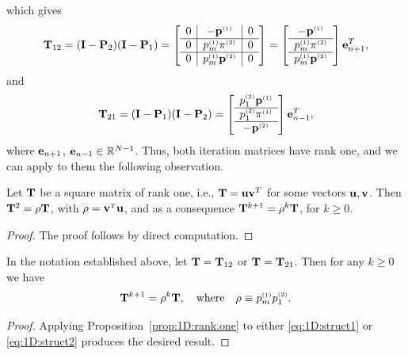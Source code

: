 %
which gives
%
\begin{equation}\label{eq:1D:struct1}
\mathbf{T}_{12}=(\mathbf{I}-\mathbf{P}_2)(\mathbf{I}-\mathbf{P}_1) = \left[\begin{array}{c|c|c}0&-\mathbf{p}^{\scriptscriptstyle (1)}&0\\\hline 0&p^{\scriptscriptstyle (1)}_m\pi^{\scriptscriptstyle (2)}&0\\\hline 0&p^{\scriptscriptstyle (1)}_m \mathbf{p}^{\scriptscriptstyle (2)}&0\end{array}\right]=
\left[\begin{array}{c}-\mathbf{p}^{\scriptscriptstyle (1)}\\\hline p^{\scriptscriptstyle (1)}_m\pi^{\scriptscriptstyle (2)}\\\hline p^{\scriptscriptstyle (1)}_m \mathbf{p}^{\scriptscriptstyle (2)}\end{array}\right]
\mathbf{e}_{n+1}^T,
\end{equation}
%
and
%
\begin{equation}\label{eq:1D:struct2}
\mathbf{T}_{21}=(\mathbf{I}-\mathbf{P}_1)(\mathbf{I}-\mathbf{P}_2)=
\left[\begin{array}{c}
 p^{\scriptscriptstyle (2)}_1 \mathbf{p}^{\scriptscriptstyle (1)}\\
\hline
 p^{\scriptscriptstyle (2)}_1\pi^{\scriptscriptstyle (1)}\\
 \hline
  -\mathbf{p}^{\scriptscriptstyle (2)}\end{array}\right]
\mathbf{e}_{n-1}^T,
\end{equation}
where $\mathbf{e}_{n+1}$, $\mathbf{e}_{n-1}\in \mathbb{R}^{N-1}$.
%
Thus, both iteration matrices have rank one, and we can apply to them the
following observation.

\begin{prop} \label{prop:1D:rank.one}
Let $\mathbf{T}$ be a square matrix of rank one, i.e., $\mathbf{T}=\mathbf{u}\mathbf{v}^T$ for some
vectors $\mathbf{u}, \mathbf{v}$. Then $\mathbf{T}^2 = \rho \mathbf{T}$, with $\rho = \mathbf{v}^{\scriptscriptstyle T}\mathbf{u}$, and as
a consequence $\mathbf{T}^{k+1} = \rho^{k} \mathbf{T}$, for $k\geq 0$.
\end{prop}

\begin{proof}
The proof follows by direct computation.
\end{proof}

\begin{cor}\label{cor:1D:rank.one}
In the notation established above, let $\mathbf{T}=\mathbf{T}_{12}$ or
$\mathbf{T}=\mathbf{T}_{21}$. Then for any $k\geq 0$ we have
%
\begin{equation}\label{eq:1D:Tkp1_1d}
\mathbf{T}^{k+1} =  \rho^{k} \mathbf{T},\quad\mbox{where}\quad \rho \equiv p^{\scriptscriptstyle (1)}_m p^{\scriptscriptstyle (2)}_1.
\end{equation}
%
\end{cor}

\begin{proof}
Applying Proposition~\ref{prop:1D:rank.one} to either
\eqref{eq:1D:struct1} or \eqref{eq:1D:struct2} produces the desired result.
%
\end{proof}

